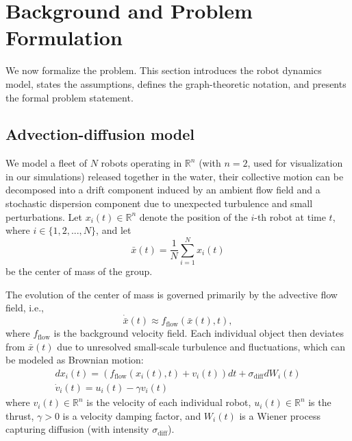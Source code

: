 \documentclass[conference]{IEEEconf}
\theoremstyle{plain}
\begin{document}

\section{Background and Problem Formulation}\label{sec:prob}

We now formalize the problem. This section introduces the robot dynamics model, states the assumptions, defines the graph-theoretic notation, and presents the formal problem statement.
\subsection{Advection-diffusion model \cite{taylor1922, okubo1971, majda1999}}

We model a fleet of $N$ robots operating in $\mathbb{R}^n$ (with $n=2$, used for visualization in our simulations) released together in the water, their collective motion can be decomposed into a drift component induced by an ambient flow field and a stochastic dispersion component due to unexpected turbulence and small perturbations. Let $x_i(t) \in \mathbb{R}^n$ denote the position of the $i$-th robot at time $t$, where $i\in \{1,2,...,N\}$, and let  
\[
\bar{x}(t) = \frac{1}{N} \sum_{i=1}^N x_i(t)
\]  
be the center of mass of the group. 

The evolution of the center of mass is governed primarily by the advective flow field, i.e.,  
\[
\dot{\bar{x}}(t) \approx f_{\text{flow}}(\bar{x}(t),t),
\]  
where $f_{\text{flow}}$ is the background velocity field. Each individual object then deviates from $\bar{x}(t)$ due to unresolved small-scale turbulence and fluctuations, which can be modeled as Brownian motion:  
\begin{equation}
\begin{gathered}
    dx_i(t) = (f_{\text{flow}}(x_i(t), t) + v_i(t)) dt + \sigma_{\text{diff}} dW_i(t) \\
    \dot{v}_i(t) = u_i(t) - \gamma v_i(t)
\end{gathered}
\end{equation}
\noindent where $v_i(t) \in \mathbb{R}^n$ is the velocity of each individual robot, $u_i(t) \in \mathbb{R}^n$ is the thrust, $\gamma > 0$ is a velocity damping factor, and $W_i(t)$ is a Wiener process capturing diffusion (with intensity $\sigma_{\text{diff}}$).
\end{document}
